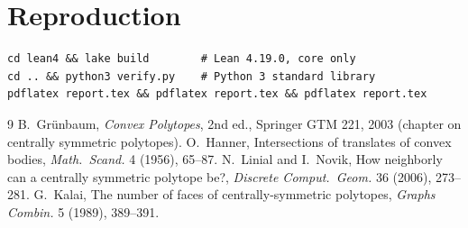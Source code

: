 \documentclass[11pt]{article}
\theoremstyle{definition}
\theoremstyle{remark}
\begin{document}
\section{Reproduction}
\begin{verbatim}
cd lean4 && lake build        # Lean 4.19.0, core only
cd .. && python3 verify.py    # Python 3 standard library
pdflatex report.tex && pdflatex report.tex && pdflatex report.tex
\end{verbatim}

\begin{thebibliography}{9}
 B.~Gr\"unbaum, \emph{Convex Polytopes}, 2nd ed., Springer GTM 221, 2003
(chapter on centrally symmetric polytopes).
 O.~Hanner, Intersections of translates of convex bodies,
\emph{Math.\ Scand.} 4 (1956), 65--87.
 N.~Linial and I.~Novik, How neighborly can a centrally symmetric polytope be?,
\emph{Discrete Comput.\ Geom.} 36 (2006), 273--281.
 G.~Kalai, The number of faces of centrally-symmetric polytopes,
\emph{Graphs Combin.} 5 (1989), 389--391.
\end{thebibliography}
\end{document}
